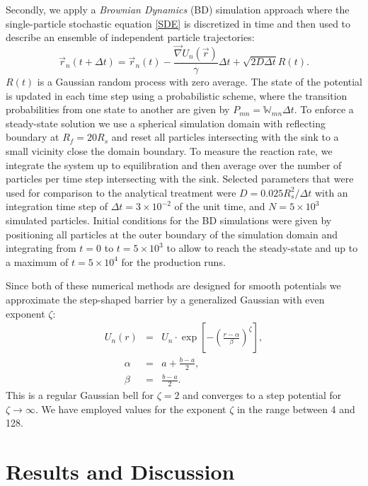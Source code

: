 \documentclass[preprint,superscriptaddress]{revtex4-1}
\begin{document}
Secondly,  we apply a \emph{Brownian Dynamics} (BD) simulation approach where the single-particle stochastic equation \eqref{SDE} is discretized in time and then used to describe an ensemble of independent particle trajectories:
\begin{equation}
    \vec r_n(t + \Delta t) = \vec r_n(t) - \frac{\vec \nabla U_n(\vec r)}{\gamma}\Delta t + \sqrt{2 D \Delta t} R(t).
    \label{discrete_eqm}
\end{equation}
$R(t)$ is a Gaussian random process with zero average.
The state of the potential is updated in each time step using a probabilistic scheme, where the transition probabilities from one state to another are given by $P_{m n} = \mathbb{W}_{m n} \Delta t$. To enforce a steady-state solution we use a spherical simulation domain with reflecting boundary at $R_f=20R_s$ and reset all particles intersecting with the sink to a small vicinity close the domain boundary. To measure the reaction rate, we integrate the system up to equilibration and then average over the number of particles per time step intersecting with the sink. Selected parameters that were used for comparison to the analytical  treatment were $D = 0.025 R_s^2/\Delta t$ with an integration time step of  $\Delta t = 3 \times 10^{-2}$ of the unit time, and 
$N = 5\times 10^{3}$ simulated particles. Initial conditions for the BD simulations were given by positioning all particles at the outer boundary of the simulation domain and integrating from $t=0$ to $t=5 \times 10^3$ to allow to reach the steady-state and up to a maximum of $t=5\times 10^4$ for the
production runs. 

Since both of these numerical methods are designed for smooth potentials we approximate the step-shaped barrier by a generalized Gaussian with even exponent $\zeta$:
\begin{eqnarray}
    U_n(r) &=& U_n \cdot \exp \left[-\left( \frac{r-\alpha}{\beta} \right)^{\zeta}\right],\\ \nonumber
     \qquad \alpha &=& a + \frac{b-a}{2},\\  \nonumber 
      \qquad \beta & =& \frac{b-a}{2}. 
    \label{mod_gauss}
\end{eqnarray}
This is a regular Gaussian bell for $\zeta=2$ and converges to a step potential for $\zeta\rightarrow \infty$. 
We have employed values for the exponent $\zeta$ in the range between 4 and 128.

\section{Results and Discussion}
\end{document}
